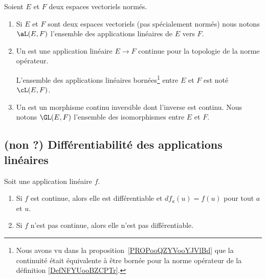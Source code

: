 \begin{definition}         \label{DEFooTLQUooJvknvi}
	Soient \( E\) et \( F\) deux espaces vectoriels normés.
	\begin{enumerate}
		\item
		      Si \( E\) et \( F\) sont deux espaces vectoriels (pas spécialement normés) nous notons \( \aL(E,F)\) l'ensemble des applications linéaires de \( E\) vers \( F\).
		\item Un  est une application linéaire \( E\to F\) continue pour la topologie de la norme opérateur.

		      L'ensemble des applications linéaires bornées\footnote{Nous avons vu dans la proposition~\ref{PROPooQZYVooYJVlBd} que la continuité était équivalente à être bornée pour la norme opérateur de la définition \ref{DefNFYUooBZCPTr}.} entre \( E\) et \( F\) est noté \( \cL(E,F)\).
		\item
		      Un  est un morphisme continu inversible dont l'inverse est continu. Nous notons \( \GL(E,F)\) l'ensemble des isomorphismes entre \( E\) et \( F\).
	\end{enumerate}
\end{definition}


\subsection{(non ?) Différentiabilité des applications linéaires}

\begin{lemma}       \label{LemooXXUGooUqCjmp}
	Soit une application linéaire \( f\).
	\begin{enumerate}
		\item
		      Si \( f\) est continue, alors elle est différentiable et \( df_a(u)=f(u)\) pour tout \( a\) et \( u\).
		\item
		      Si \( f\) n'est pas continue, alors elle n'est pas différentiable.
	\end{enumerate}
\end{lemma}

